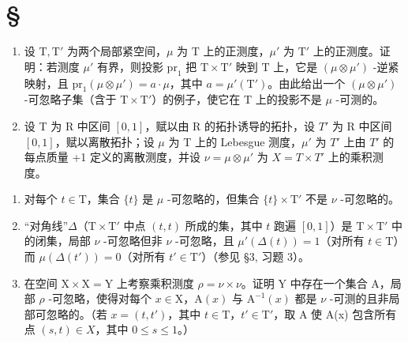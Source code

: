 \section*{\texorpdfstring{\S\CurrentExerciseGroup}{第{\CurrentExerciseGroup}节}}
{}

\begin{enumerate}
\def\labelenumi{\arabic{enumi})}
\item
  设 \(\mathrm{T}, \mathrm{T}'\) 为两个局部紧空间，\(\mu\) 为 \(\mathrm{T}\) 上的正测度，\(\mu'\) 为 \(\mathrm{T}'\) 上的正测度。证明：若测度 \(\mu'\) 有界，则投影 \(\mathrm{pr}_1\) 把 \(\mathrm{T} \times \mathrm{T}'\) 映到 \(\mathrm{T}\) 上，它是 \((\mu \otimes \mu')\) -逆紧映射，且 \(\mathrm{pr}_1(\mu \otimes \mu') = a \cdot \mu\)，其中 \(a = \mu'(\mathrm{T}')\)。由此给出一个 \((\mu \otimes \mu')\) -可忽略子集（含于 \(\mathrm{T} \times \mathrm{T}'\)）的例子，使它在 \(\mathrm{T}\) 上的投影不是 \(\mu\) -可测的。
\item
  设 T 为 R 中区间 \([0,1]\)，赋以由 R 的拓扑诱导的拓扑，设 \(T'\) 为 R 中区间 \([0,1]\)，赋以离散拓扑；设 \(\mu\) 为 T 上的 Lebesgue 测度，\(\mu'\) 为 \(T'\) 上由 \(T'\) 的每点质量 +1 定义的离散测度，并设 \(\nu = \mu \otimes \mu'\) 为 \(X = T \times T'\) 上的乘积测度。
\end{enumerate}

\begin{enumerate}
\def\labelenumi{\alph{enumi})}
\item
  对每个 \(t \in \mathrm{T}\)，集合 \(\{t\}\) 是 \(\mu\) -可忽略的，但集合 \(\{t\} \times \mathrm{T}'\) 不是 \(\nu\) -可忽略的。
\item
  “对角线”\(\Delta\)（\(\mathrm{T} \times \mathrm{T}'\) 中点 \((t, t)\) 所成的集，其中 \(t\) 跑遍 \([0, 1]\)）是 \(\mathrm{T} \times \mathrm{T}'\) 中的闭集，局部 \(\nu\) -可忽略但非 \(\nu\) -可忽略，且 \(\mu'(\Delta(t)) = 1\)（对所有 \(t \in \mathrm{T}\)）而 \(\mu(\Delta(t')) = 0\)（对所有 \(t' \in \mathrm{T}'\)）（参见 §3, 习题 3）。
\item
  在空间 \(\mathrm{X} \times \mathrm{X} = \mathrm{Y}\) 上考察乘积测度 \(\rho = \nu \times \nu\)。证明 \(\mathrm{Y}\) 中存在一个集合 \(\mathrm{A}\)，局部 \(\rho\) -可忽略，使得对每个 \(x \in \mathrm{X}\)，\(\mathrm{A}(x)\) 与 \(\mathrm{A}^{-1}(x)\) 都是 \(\nu\) -可测的且非局部可忽略的。（若 \(x = (t, t')\)，其中 \(t \in \mathrm{T}\)，\(t' \in \mathrm{T}'\)，取 A 使 A(x) 包含所有点 \((s, t) \in X\)，其中 \(0 \leqslant s \leqslant 1\)。）
\end{enumerate}

